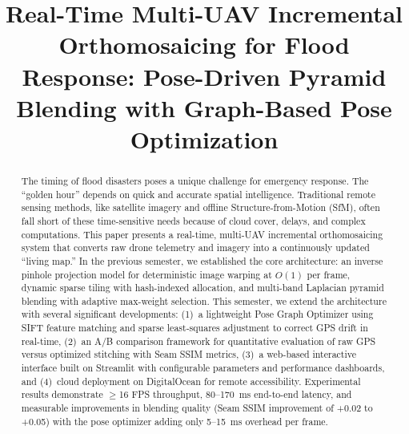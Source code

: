 \documentclass[conference]{IEEEtran}
\begin{document}
\title{Real-Time Multi-UAV Incremental Orthomosaicing for Flood Response: Pose-Driven Pyramid Blending with Graph-Based Pose Optimization}

\author{
\and
{}
}

\maketitle

\begin{abstract}
The timing of flood disasters poses a unique challenge for emergency response. The ``golden hour'' depends on quick and accurate spatial intelligence. Traditional remote sensing methods, like satellite imagery and offline Structure-from-Motion (SfM), often fall short of these time-sensitive needs because of cloud cover, delays, and complex computations. This paper presents a real-time, multi-UAV incremental orthomosaicing system that converts raw drone telemetry and imagery into a continuously updated ``living map.'' In the previous semester, we established the core architecture: an inverse pinhole projection model for deterministic image warping at $O(1)$ per frame, dynamic sparse tiling with hash-indexed allocation, and multi-band Laplacian pyramid blending with adaptive max-weight selection. This semester, we extend the architecture with several significant developments: (1)~a lightweight Pose Graph Optimizer using SIFT feature matching and sparse least-squares adjustment to correct GPS drift in real-time, (2)~an A/B comparison framework for quantitative evaluation of raw GPS versus optimized stitching with Seam SSIM metrics, (3)~a web-based interactive interface built on Streamlit with configurable parameters and performance dashboards, and (4)~cloud deployment on DigitalOcean for remote accessibility. Experimental results demonstrate $\geq$16 FPS throughput, 80--170~ms end-to-end latency, and measurable improvements in blending quality (Seam SSIM improvement of +0.02 to +0.05) with the pose optimizer adding only 5--15~ms overhead per frame.
\end{abstract}
\end{document}
